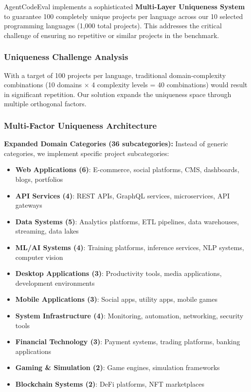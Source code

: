 \documentclass{article}
\begin{document}
AgentCodeEval implements a sophisticated \textbf{Multi-Layer Uniqueness System} to guarantee 100 completely unique projects per language across our 10 selected programming languages (1,000 total projects). This addresses the critical challenge of ensuring no repetitive or similar projects in the benchmark.

\subsubsection{Uniqueness Challenge Analysis}
With a target of 100 projects per language, traditional domain-complexity combinations (10 domains × 4 complexity levels = 40 combinations) would result in significant repetition. Our solution expands the uniqueness space through multiple orthogonal factors.

\subsubsection{Multi-Factor Uniqueness Architecture}

\textbf{Expanded Domain Categories (36 subcategories):}
Instead of generic categories, we implement specific project subcategories:
\begin{itemize}
    \item \textbf{Web Applications (6)}: E-commerce, social platforms, CMS, dashboards, blogs, portfolios
    \item \textbf{API Services (4)}: REST APIs, GraphQL services, microservices, API gateways
    \item \textbf{Data Systems (5)}: Analytics platforms, ETL pipelines, data warehouses, streaming, data lakes
    \item \textbf{ML/AI Systems (4)}: Training platforms, inference services, NLP systems, computer vision
    \item \textbf{Desktop Applications (3)}: Productivity tools, media applications, development environments
    \item \textbf{Mobile Applications (3)}: Social apps, utility apps, mobile games
    \item \textbf{System Infrastructure (4)}: Monitoring, automation, networking, security tools
    \item \textbf{Financial Technology (3)}: Payment systems, trading platforms, banking applications
    \item \textbf{Gaming \& Simulation (2)}: Game engines, simulation frameworks
    \item \textbf{Blockchain Systems (2)}: DeFi platforms, NFT marketplaces
\end{itemize}
\end{document}
